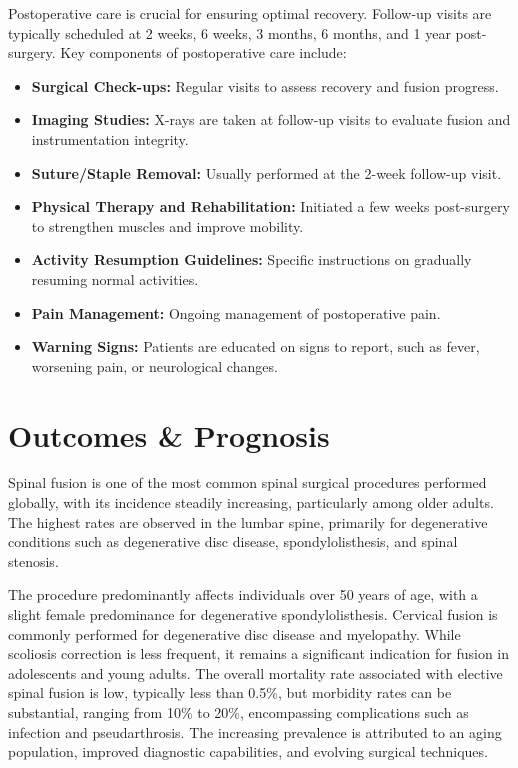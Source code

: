 Postoperative care is crucial for ensuring optimal recovery. Follow-up visits are typically scheduled at 2 weeks, 6 weeks, 3 months, 6 months, and 1 year post-surgery. Key components of postoperative care include:

\begin{itemize}
  \item \textbf{Surgical Check-ups:} Regular visits to assess recovery and fusion progress.
  \item \textbf{Imaging Studies:} X-rays are taken at follow-up visits to evaluate fusion and instrumentation integrity.
  \item \textbf{Suture/Staple Removal:} Usually performed at the 2-week follow-up visit.
  \item \textbf{Physical Therapy and Rehabilitation:} Initiated a few weeks post-surgery to strengthen muscles and improve mobility.
  \item \textbf{Activity Resumption Guidelines:} Specific instructions on gradually resuming normal activities.
  \item \textbf{Pain Management:} Ongoing management of postoperative pain.
  \item \textbf{Warning Signs:} Patients are educated on signs to report, such as fever, worsening pain, or neurological changes.
\end{itemize}

\section*{Outcomes \& Prognosis}
Spinal fusion is one of the most common spinal surgical procedures performed globally, with its incidence steadily increasing, particularly among older adults. The highest rates are observed in the lumbar spine, primarily for degenerative conditions such as degenerative disc disease, spondylolisthesis, and spinal stenosis. 

The procedure predominantly affects individuals over 50 years of age, with a slight female predominance for degenerative spondylolisthesis. Cervical fusion is commonly performed for degenerative disc disease and myelopathy. While scoliosis correction is less frequent, it remains a significant indication for fusion in adolescents and young adults. The overall mortality rate associated with elective spinal fusion is low, typically less than 0.5\%, but morbidity rates can be substantial, ranging from 10\% to 20\%, encompassing complications such as infection and pseudarthrosis. The increasing prevalence is attributed to an aging population, improved diagnostic capabilities, and evolving surgical techniques.


